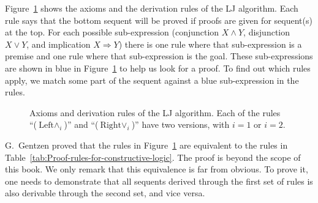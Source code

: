 Figure~\ref{fig:Rules-of-the-LJ-algorithm} shows the axioms and
the derivation rules of the LJ algorithm. Each rule says that the
bottom sequent will be proved if proofs are given for sequent(s) at
the top. For each possible sub-expression (conjunction $X\wedge Y$,
disjunction $X\vee Y$, and implication $X\Rightarrow Y$) there is
one rule where that sub-expression is a premise and one rule where
that sub-expression is the goal. These sub-expressions are shown in
blue in Figure~\ref{fig:Rules-of-the-LJ-algorithm} to help us look
for a proof. To find out which rules apply, we match some part of
the sequent against a blue sub-expression in the rules.

\begin{figure}
\begin{centering}
\par\end{centering}
\caption{Axioms and derivation rules of the LJ algorithm. Each of the rules
\textquotedblleft ($\text{Left}\wedge_{i}$)\textquotedblright{} and
\textquotedblleft ($\text{Right}\vee_{i}$)\textquotedblright{} have
two versions, with $i=1$ or $i=2$. \label{fig:Rules-of-the-LJ-algorithm}}
\end{figure}

G.~Gentzen proved that the rules in Figure~\ref{fig:Rules-of-the-LJ-algorithm}
are equivalent to the rules in Table~\ref{tab:Proof-rules-for-constructive-logic}.
The proof is beyond the scope of this book. We only remark that this
equivalence is far from obvious. To prove it, one needs to demonstrate
that all sequents derived through the first set of rules is also derivable
through the second set, and vice versa.

